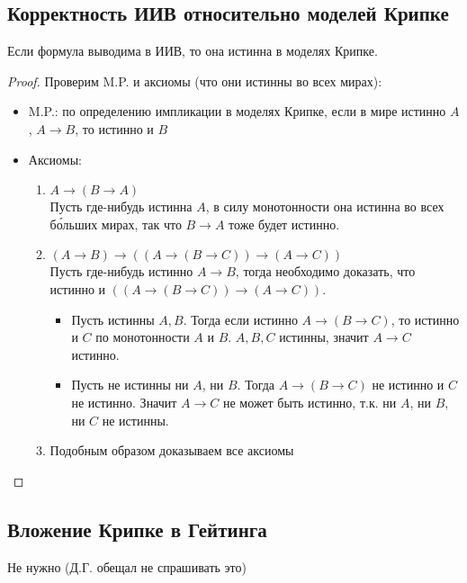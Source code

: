 \subsection{Корректность ИИВ относительно моделей Крипке}
\label{sec-6-2}
\begin{theorem}
Если формула выводима в ИИВ, то она истинна в моделях Крипке.
\end{theorem}
\begin{proof}
Проверим M.P. и аксиомы (что они истинны во всех мирах):
\begin{itemize}
\item M.P.: по определению импликации в моделях Крипке, если в мире истинно $A$, $A \rightarrow B$, то истинно и $B$
\item Аксиомы:
\begin{enumerate}
\item $A \rightarrow (B \rightarrow A)$\\
Пусть где-нибудь истинна $A$, в силу монотонности она истинна во всех б\'ольших мирах, так что $B \rightarrow A$ тоже будет истинно.
\item $(A \rightarrow B) \rightarrow ((A \rightarrow (B \rightarrow C)) \rightarrow (A \rightarrow C))$\\
Пусть где-нибудь истинно $A \rightarrow B$, тогда необходимо доказать, что истинно и $((A \rightarrow (B \rightarrow C)) \rightarrow (A \rightarrow C))$.
\begin{itemize}
\item Пусть истинны $A, B$. Тогда если истинно $A \rightarrow (B \rightarrow C)$, то истинно и $C$ по монотонности $A$ и $B$. $A, B, C$ истинны, значит $A \rightarrow C$ истинно.
\item Пусть не истинны ни $A$, ни $B$. Тогда $A \rightarrow (B \rightarrow C)$ не истинно и $C$ не истинно. Значит $A \rightarrow C$ не может быть истинно, т.к. ни $A$, ни $B$, ни $C$ не истинны.\\
\end{itemize}
\item Подобным образом доказываем все аксиомы
\end{enumerate}
\end{itemize}
\end{proof}
\subsection{Вложение Крипке в Гейтинга}
\label{sec-6-3}
Не нужно (Д.Г. обещал не спрашивать это)
